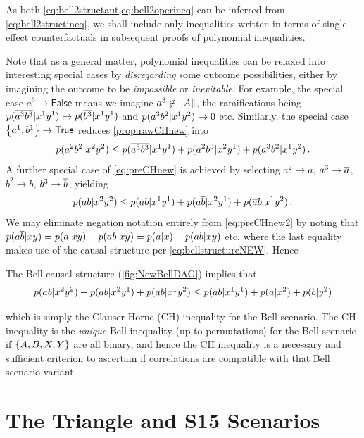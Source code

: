 As both \cref{eq:bell2structaut,eq:bell2operineq} can be inferred from \cref{eq:bell2structineq}, we shall include only inequalities written in terms of single-effect counterfactuals in subsequent proofs of polynomial inequalities.



Note that as a general matter, polynomial inequalities can be relaxed into interesting special cases by \emph{disregarding} some outcome possibilities, either by imagining the outcome to be \emph{impossible} or \emph{inevitable}. For example, the special case $a^3\to \mathsf{False}$ means we imagine  $a^3\not\in \lVert A\rVert$, the ramifications being $p\lparen\overline{a^3} \overline{b^3}|x^1 y^1\rparen\to p\lparen\overline{b^3}|x^1 y^1\rparen$ and $p\lparen a^3 b^2|x^1 y^2\rparen\to 0$ etc. Similarly, the special case $\left\lbrace a^1,b^1\right\rbrace\to \mathsf{True}$ reduces \cref{prop:rawCHnew} into
\begin{align}\label{eq:preCHnew}
p\lparen a^2 b^2|x^2 y^2\rparen
\leq
{
p\lparen\ensuremath{\overline{a^3}} \ensuremath{\overline{b^3}}|x^1 y^1\rparen
+p\lparen a^2 b^3|x^2 y^1\rparen
+p\lparen a^3 b^2|x^1 y^2\rparen
}\,.
\end{align}
A further special case of \cref{eq:preCHnew} is achieved by selecting $a^2\to a$, $a^3\to \overline{a}$, $b^2\to b$, $b^3\to \overline{b}$, yielding
\begin{align}\label{eq:preCHnew2}
p\lparen a b|x^2 y^2\rparen
\leq
{
p\lparen a b|x^1 y^1\rparen
+p\lparen a \ensuremath{\overline{b}}|x^2 y^1\rparen
+p\lparen\ensuremath{\overline{a}} b|x^1 y^2\rparen
}\,.
\end{align}
We may eliminate negation notation entirely from \cref{eq:preCHnew2} by noting that $p\lparen a \overline{b} | x y\rparen = p\lparen a | x y\rparen-p\lparen a b | x y\rparen = p\lparen a | x\rparen-p\lparen a b | x y\rparen$ etc, where the last equality makes use of the causal structure per \cref{eq:bellstructureNEW}. Hence
\begin{prop}\label{prop:CHnew}
The Bell causal structure (\cref{fig:NewBellDAG}) implies that
\begin{align*}
p\lparen a b|x^2 y^2\rparen+p\lparen a b|x^2 y^1\rparen+p\lparen a b|x^1 y^2\rparen
\leq
{
p\lparen a b|x^1 y^1\rparen
+p\lparen a |x^2\rparen
+p\lparen b |y^2\rparen
}
\end{align*}
\end{prop}
which is simply the Clauser-Horne (CH) inequality \cite{CHInequality} for the Bell scenario. The CH inequality is the \emph{unique} Bell inequality (up to permutations) for the Bell scenario if $\left\lbrace A,B,X,Y\right\rbrace$ are all binary, and hence the CH inequality is a necessary and sufficient criterion to ascertain if correlations are compatible with that Bell scenario variant.





\section{The Triangle and S15 Scenarios }

